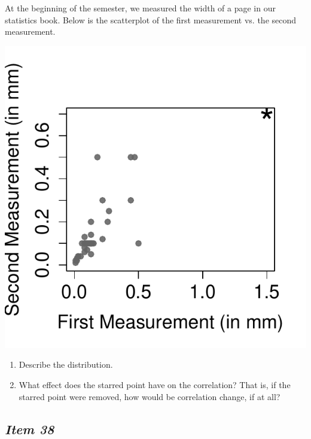 At the beginning of the semester, we measured the width of a page in our statistics book. Below is the scatterplot of the first measurement vs. the second measurement. 





\begin{marginfigure}


\includegraphics{includes/Item32_R.pdf}


\end{marginfigure}





\begin{enumerate}[leftmargin=1cm, itemsep=.2em]


\item Describe the distribution.


\item What effect does the starred point have on the correlation? That is, if the starred point were removed, how would be correlation change, if at all?


\end{enumerate}





\subsection{\textbf{\textit{Item 38}}}


